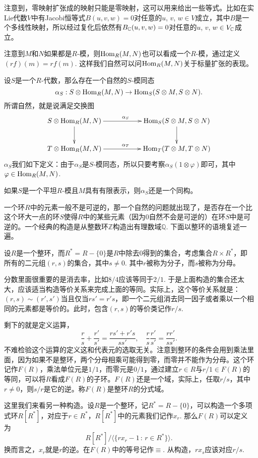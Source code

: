注意到，零映射扩张成的映射只能是零映射，这可以用来给出一些等式。比如在实Lie代数$V$中有Jacobi恒等式$B(u,v,w)=0$对任意的$u$, $v$, $w\in V$成立，其中$B$是一个多线性映射，所以经过复化后依然有$B_{\mathbb{C}} (u,v,w)=0$对任意的$u$, $v$, $w\in V_{\mathbb{C}}$成立。

\para 注意到$M$和$N$如果都是$R$-模，则$\operatorname{Hom}_R(M,N)$也可以看成一个$R$-模，通过定义$(rf)(m)=rf(m)$. 这样我们自然可以问$\operatorname{Hom}_R(M,N)$关于标量扩张的表现。

设$S$是一个$R$-代数，那么存在一个自然的$S$-模同态
\[
	\alpha_S:S\otimes\operatorname{Hom}_R(M,N)\to \operatorname{Hom}_S(S\otimes M,S\otimes N).
\]
所谓自然，就是说满足交换图
\[
\begin{xy}
	\xymatrix
	{
		S\otimes\Hom_R(M,N)\ar[rr]^{\alpha_S}\ar[d]&&\Hom_S(S\otimes M,S\otimes N)\ar[d]\\
		T\otimes\Hom_R(M,N)\ar[rr]^{\alpha_T}&&\Hom_T(T\otimes M,T\otimes N)
	}
\end{xy}
\]
$\alpha_S$我们如下定义：由于$\alpha_S$是$S$-模同态，所以只要考察$\alpha_S(1\otimes \varphi)$即可，其中$\varphi\in \operatorname{Hom}_R(M,N)$. 

如果$S$是一个平坦$R$-模且$M$具有有限表示，则$\alpha_S$还是一个同构。

\para 一个环$R$中的元素一般不是可逆的，那一个自然的问题就出现了，是否存在一个比这个环大一点的环$S$使得$R$中的某些元素（因为0自然不会是可逆的）在环$S$中是可逆的。一个经典的构造是从整数环$\mathbb{Z}$构造出有理数域$\mathbb{Q}$. 下面以整环的语境复述一遍。

设$R$是一个整环，而$R^{*}=R-\{0\}$是$R$中除去$0$得到的集合，考虑集合$R\times R^{*}$，即所有的二元组$(r,s)$的集合，其中$s\neq 0$. 其中$r$被称为分子，而$s$被称为分母。

分数里面很重要的是消去率，比如$8/4$应该等同于$2/1$. 于是上面构造的集合还太大，应该适当构造等价关系来完成上面的等同。实际上，这个等价关系就是：$(r,s)\sim (r',s')$当且仅当$rs'=r's$，即一个二元组消去同一因子或者乘以一个相同的元素都是等价的。此时，包含$(r,s)$的等价类记作$r/s$.

剩下的就是定义运算，
\[
	\frac{r}{s}+\frac{r'}{s'}=\frac{rs'+r's}{ss'},\quad \frac{r}{s}\frac{r'}{s'}=\frac{rr'}{ss'}.
\]
不难检验这个运算的定义这和代表元的选取无关。注意到整环的条件会用到乘法里面，因为如果不是整环，两个分母相乘可能得到零，而零并不能作为分母。这个环记作$F(R)$，乘法单位元是$1/1$，而零元是$0/1$，通过建立$r\in R$与$r/1\in F(R)$的等同，可以将$R$看成$F(R)$的子环。$F(R)$还是一个域，实际上，任取$r/s$，其中$r\neq 0$，则$s/r$是它的逆。称$F(R)$是整环$R$的分式域。

\para 这里我们来看另一种构造。设$R$是一个整环，记$R^*=R-\{0\}$，可以构造一个多项式环$R[R^*]$，对应于$r\in R^*$，$R[R^*]$中的元素我们记作$x_r$. 那么$F(R)$可以定义为
\[
	R[R^*]\big/\bigl\langle\{rx_r-1\,:\, r\in R^*\}\bigr\rangle.
\]
换而言之，$x_r$就是$r$的逆。在$F(R)$中的等号记作$\equiv$. 从构造，$rx_s$应该对应$r/s$.

